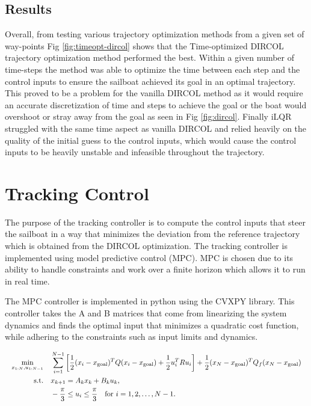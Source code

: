\documentclass[conference]{IEEEtran}
\begin{document}
\subsection{Results}
Overall, from testing various trajectory optimization methods from a given set of way-points Fig \ref{fig:timeopt-dircol} shows that the Time-optimized DIRCOL trajectory optimization method performed the best. Within a given number of time-steps the method was able to optimize the time between each step and the control inputs to ensure the sailboat achieved its goal in an optimal trajectory. This proved to be a problem for the vanilla DIRCOL method as it would require an accurate discretization of time and steps to achieve the goal or the boat would overshoot or stray away from the goal as seen in Fig \ref{fig:dircol}. Finally iLQR struggled with the same time aspect as vanilla DIRCOL and relied heavily on the quality of the initial guess to the control inputs, which would cause the control inputs to be heavily unstable and infeasible throughout the trajectory.

\section{Tracking Control}
\label{section:tracking_control}
The purpose of the tracking controller is to compute the control inputs that steer the sailboat in a way that minimizes the deviation from the reference trajectory which is obtained from the DIRCOL optimization. The tracking controller is implemented using model predictive control (MPC). MPC is chosen due to its ability to handle constraints and work over a finite horizon which allows it to run in real time.

The MPC controller is implemented in python using the CVXPY library. This controller takes the A and B matrices that come from linearizing the system dynamics and finds the optimal input that minimizes a quadratic cost function, while adhering to the constraints such as input limits and dynamics.

\begin{equation}
\resizebox{\linewidth}{!}{$
\begin{aligned}
\min_{x_{1:N}, u_{1:N-1}} \quad & \sum_{i=1}^{N-1} \left[ \frac{1}{2} (x_i - x_{\text{goal}})^T Q (x_i - x_{\text{goal}}) + \frac{1}{2} u_i^T R u_i \right] + \frac{1}{2} (x_N - x_{\text{goal}})^T Q_f (x_N - x_{\text{goal}}) \\ 
\text{s.t.} \quad & x_{k+1} = A_k x_k + B_k u_k, \\
& -\frac{\pi}{3} \leq u_i \leq \frac{\pi}{3} \quad \text{for } i = 1, 2, \ldots, N-1.
\end{aligned}
$}
\end{equation}
\end{document}
